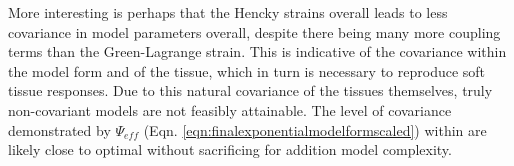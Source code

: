     More interesting is perhaps that the Hencky strains overall leads to less covariance in model parameters overall, despite there being many more coupling terms than the Green-Lagrange strain. This is indicative of the covariance within the model form and of the tissue, which in turn is necessary to reproduce soft tissue responses. Due to this natural covariance of the tissues themselves, truly non-covariant models are not feasibly attainable. The level of covariance demonstrated by $\Psi_{eff}$ (Eqn. \ref{eqn:finalexponentialmodelformscaled}) within are likely close to optimal without sacrificing for addition model complexity. 



















